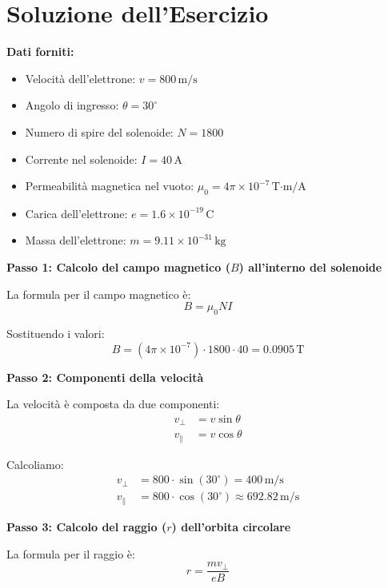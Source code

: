 \documentclass{article}
\begin{document}
\section*{Soluzione dell'Esercizio}

\textbf{Dati forniti:}
\begin{itemize}
    \item Velocità dell'elettrone: \(v = 800 \, \text{m/s}\)
    \item Angolo di ingresso: \(\theta = 30^\circ\)
    \item Numero di spire del solenoide: \(N = 1800\)
    \item Corrente nel solenoide: \(I = 40 \, \text{A}\)
    \item Permeabilità magnetica nel vuoto: \(\mu_0 = 4 \pi \times 10^{-7} \, \text{T·m/A}\)
    \item Carica dell'elettrone: \(e = 1.6 \times 10^{-19} \, \text{C}\)
    \item Massa dell'elettrone: \(m = 9.11 \times 10^{-31} \, \text{kg}\)
\end{itemize}

\textbf{Passo 1: Calcolo del campo magnetico (\(B\)) all'interno del solenoide}

La formula per il campo magnetico è:
\begin{equation}
B = \mu_0 N I
\end{equation}

Sostituendo i valori:
\begin{equation}
B = (4 \pi \times 10^{-7}) \cdot 1800 \cdot 40 = 0.0905 \, \text{T}
\end{equation}

\textbf{Passo 2: Componenti della velocità}

La velocità è composta da due componenti:
\begin{align}
v_\perp &= v \sin \theta \\
v_\parallel &= v \cos \theta
\end{align}

Calcoliamo:
\begin{align}
v_\perp &= 800 \cdot \sin(30^\circ) = 400 \, \text{m/s} \\
v_\parallel &= 800 \cdot \cos(30^\circ) \approx 692.82 \, \text{m/s}
\end{align}

\textbf{Passo 3: Calcolo del raggio (\(r\)) dell'orbita circolare}

La formula per il raggio è:
\begin{equation}
r = \frac{m v_\perp}{e B}
\end{equation}
\end{document}
